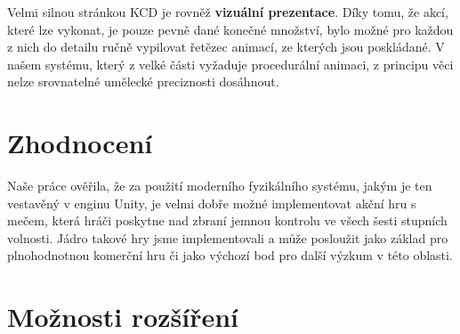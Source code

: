 Velmi silnou stránkou \acl{KCD} je rovněž \textbf{vizuální prezentace}. Díky tomu, že akcí, které lze vykonat, je pouze pevně dané konečné množství, bylo možné pro každou z nich do detailu ručně vypilovat řetězec animací, ze kterých jsou poskládané. V našem systému, který z velké části vyžaduje procedurální animaci, z principu věci nelze srovnatelné umělecké preciznosti dosáhnout. 


\section{Zhodnocení}

Naše práce ověřila, že za použití moderního fyzikálního systému, jakým je ten vestavěný v enginu Unity, je velmi dobře možné implementovat akční hru s mečem, která hráči poskytne nad zbraní jemnou kontrolu ve všech šesti stupních volnosti. Jádro takové hry jsme implementovali a může posloužit jako základ pro plnohodnotnou komerční hru či jako výchozí bod pro další výzkum v této oblasti.




\section{Možnosti rozšíření}

